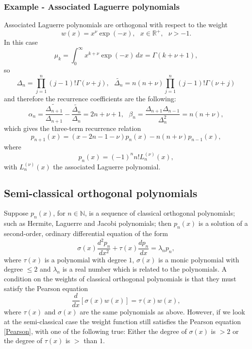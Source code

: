 \documentclass[12pt]{article}
\def\N{\mathbb{N}}
\def\R{\mathbb{R}}
\numberwithin{figure}{section}
\numberwithin{equation}{section}
\numberwithin{table}{section}
\begin{document}
\subsubsection{Example - Associated Laguerre polynomials}
Associated Laguerre polynomials are orthogonal with respect to the weight
$$w(x)=x^\nu\exp(-x),~~~x\in\R^{+},~~~\nu >-1.$$
In this case
\begin{equation}
\mu_{k}=\int^\infty_{0}x^{k+\nu}\exp(-x)\,dx=\Gamma(k+\nu+1),
\end{equation}
so
$$
\Delta_n=\prod^{n}_{j=1}(j-1)!\Gamma(\nu+j),~~~\widetilde{\Delta_n}=n(n+\nu)\prod^n_{j=1}(j-1)!\Gamma(\nu+j)
$$
and therefore the recurrence coefficients are the following:
$$\alpha_n=\frac{\widetilde{\Delta_{n+1}}}{{\Delta_{n+1}}}-\frac{\widetilde{\Delta_{n}}}{{\Delta_{n}}}=2n+\nu+1,~~~\beta_n=\frac{\Delta_{n+1}\Delta_{n-1}}{\Delta_n^2}=n(n+\nu),$$
which gives the three-term recurrence relation
$$p_{n+1}(x)=(x-2n-1-\nu)p_n(x)-n(n+\nu)p_{n-1}(x),$$
where
$$p_n(x)=(-1)^n n!L_n^{(\nu)}(x),$$
with $L_n^{(\nu)}(x)$ the associated Laguerre polynomial.
\subsection{Semi-classical orthogonal polynomials}
Suppose $p_n(x)$, for $n\in\N$, is a sequence of classical orthogonal polynomials; such as Hermite, Laguerre and
Jacobi polynomials; then $p_n(x)$ is a solution of a second-order, ordinary differential equation of the form
\begin{equation}
\sigma(x)\frac{d^2p_n}{dx^2}+\tau(x)\frac{dp_n}{dx}=\lambda_np_n,
\end{equation}
where $\tau(x)$ is a polynomial with degree $1$, $\sigma(x)$ is a monic polynomial with degree $\leq 2$ and $\lambda_n$ is a real number which is related to the polynomials. A condition on the weights of classical orthogonal polynomials is that they must satisfy the Pearson equation
\begin{equation}
\frac{d}{dx}[\sigma(x)w(x)]=\tau(x)w(x),\label{Pearson}
\end{equation}
where $\tau(x)$ and $\sigma(x)$ are the same polynomials as above. However, if we look at the semi-classical case the weight function still satisfies the Pearson equation \eqref{Pearson}, with one of the following true: Either the degree of $\sigma(x)$ is $>2$ or the degree of $\tau(x)$ is $>$ than $1$.
\end{document}
